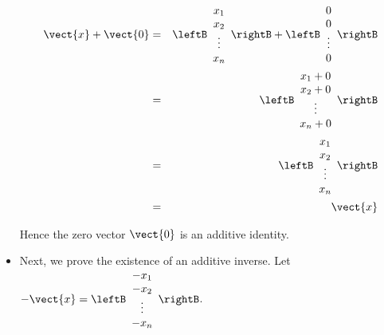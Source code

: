 \begin{solution}
\begin{itemize}
\begin{eqnarray*}
\vect{x} + \vect{0} &=& 
\leftB \begin{array}{c}
x_1 \\
x_2 \\
\vdots \\
x_n
\end{array}\rightB + \leftB \begin{array}{c}
0 \\
0 \\
\vdots \\
0
\end{array}
\rightB \\
&=& \leftB \begin{array}{c}
x_1 + 0 \\
x_2 + 0 \\
\vdots \\
x_n + 0 
\end{array}\rightB \\
&=& \leftB \begin{array}{c}
x_1 \\
x_2 \\
\vdots \\
x_n
\end{array}\rightB \\
&=& \vect{x}
\end{eqnarray*} 

Hence the zero vector $\vect{0}$ is an additive identity. 

\item
Next, we prove the existence of an additive inverse. 
Let $-\vect{x} = \leftB \begin{array}{c}
-x_1 \\
-x_2 \\
\vdots \\
-x_n
\end{array}\rightB$. 


\end{itemize}
\end{solution}
